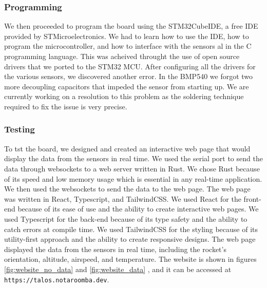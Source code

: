 \documentclass{article}
\begin{document}
\subsubsection{Programming}
We then proceeded to program the board using the STM32CubeIDE, a free IDE provided by STMicroelectronics\cite{STM32CubeIDE}. We had to learn how to use the IDE, how to program the microcontroller, and how to interface with the sensors al in the C programming language. This was acheived throught the use of open source drivers that we ported to the STM32 MCU. After configuring all the drivers for the various sensors, we discovered another error. In the BMP540 we forgot two more decoupling capacitors that impeded the sensor from starting up. We are currently working on a resolution to this problem as the soldering technique required to fix the issue is very precise.
\subsubsection{Testing}
To tst the board, we designed and created an interactive web page that would display the data from the sensors in real time. We used the serial port to send the data through websockets to a web server written in Rust. We chose Rust because of its speed and low memory usage which is essential in any real-time application. We then used the websockets to send the data to the web page. The web page was written in React, Typescript, and TailwindCSS. We used React for the front-end because of its ease of use and the ability to create interactive web pages. We used Typescript for the back-end because of its type safety and the ability to catch errors at compile time. We used TailwindCSS for the styling because of its utility-first approach and the ability to create responsive designs. The web page displayed the data from the sensors in real time, including the rocket's orientation, altitude, airspeed, and temperature. The website is shown in figures \ref{fig:website_no_data} and \ref{fig:website_data} , and it can be accessed at \texttt{https://talos.notaroomba.dev}.
\end{document}
